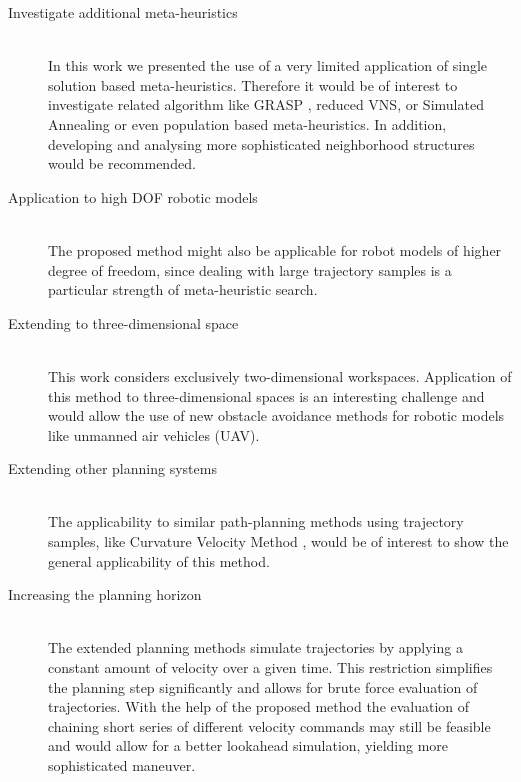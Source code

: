 \begin{description}
\item[Investigate additional meta-heuristics]\hfill \\
In this work we presented the use of a very limited application of single solution based meta-heuristics. Therefore it would be of interest to investigate related algorithm like GRASP \cite{feo1995grasp}, reduced VNS, or Simulated Annealing \cite{Kirkpatrick83SimulatedAnnealing} or even population based meta-heuristics.
In addition, developing and analysing more sophisticated neighborhood structures would be recommended. 

\item[Application to high DOF robotic models]\hfill \\
The proposed method might also be applicable for robot models of higher degree of freedom, since dealing with large trajectory samples is a particular strength of meta-heuristic search.

\item[Extending to three-dimensional space]\hfill \\
This work considers exclusively two-dimensional workspaces. Application of this method to three-dimensional spaces is an interesting challenge and would allow the use of new obstacle avoidance methods for robotic models like unmanned air vehicles (UAV).

\item[Extending other planning systems]\hfill \\
The applicability to similar path-planning methods using trajectory samples, like Curvature Velocity Method \cite{simmons1996curvature}, would be of interest to show the general applicability of this method. 


\item[Increasing the planning horizon]\hfill \\
The extended planning methods simulate trajectories by applying a constant amount of velocity over a given time. This restriction simplifies the planning step significantly and allows for brute force evaluation of trajectories. With the help of the proposed method the evaluation of chaining short series of different velocity commands may still be feasible and would allow for a better lookahead simulation, yielding more sophisticated maneuver.

\end{description}
